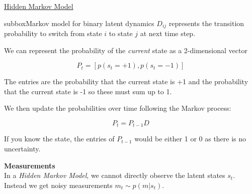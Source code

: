 \begin{textbox}{\href{http://instructor.compneuro.neuromatch.io/tutorials/W3D2_HiddenDynamics/instructor/W3D2_Tutorial2.html}{Hidden Markov Model }   }
\begin{subbox}{subbox}{Markov model for binary latent dynamics}
$D_{ij}$ represents the transition probability to switch from state $i$ to state $j$ at next time step. 

We can represent the probability of the \textit{current} state as a 2-dimensional vector 

\begin{equation*}
P_t = [p(s_t = +1), p(s_t = -1)]
\end{equation*}

The entries are the probability that the current state is +1 and the probability that the current state is -1 so these must sum up to 1.

We then update the probabilities over time following the Markov process:

\begin{equation*}
P_{t}= P_{t-1}D 
\end{equation*}

If you know the state, the entries of $P_{t-1}$ would be either 1 or 0 as there is no uncertainty.

\textbf{Measurements}\\
In a \textit{Hidden Markov Model}, we cannot directly observe the latent states $s_t$. Instead we get noisy measurements $m_t\sim p(m|s_t)$.

\end{subbox}

\end{textbox}
